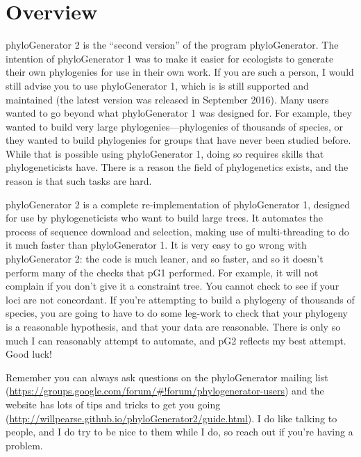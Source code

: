 \documentclass[12pt]{article}
\begin{document}
\section*{Overview}
phyloGenerator 2 is the ``second version'' of the program
phyloGenerator. The intention of phyloGenerator 1 was to make it
easier for ecologists to generate their own phylogenies for use in
their own work. If you are such a person, I would still advise you to
use phyloGenerator 1, which is is still supported and maintained (the
latest version was released in September 2016). Many users wanted to
go beyond what phyloGenerator 1 was designed for. For example, they
wanted to build very large phylogenies---phylogenies of thousands of
species, or they wanted to build phylogenies for groups that have
never been studied before. While that is possible using phyloGenerator
1, doing so requires skills that phylogeneticists have. There is a
reason the field of phylogenetics exists, and the reason is that such
tasks are hard.

phyloGenerator 2 is a complete re-implementation of phyloGenerator 1,
designed for use by phylogeneticists who want to build large trees. It
automates the process of sequence download and selection, making use
of multi-threading to do it much faster than phyloGenerator 1. It is
very easy to go wrong with phyloGenerator 2: the code is much leaner,
and so faster, and so it doesn't perform many of the checks that pG1
performed. For example, it will not complain if you don't give it a
constraint tree. You cannot check to see if your loci are not
concordant. If you're attempting to build a phylogeny of thousands of
species, you are going to have to do some leg-work to check that your
phylogeny is a reasonable hypothesis, and that your data are
reasonable. There is only so much I can reasonably attempt to
automate, and pG2 reflects my best attempt. Good luck!

Remember you can always ask questions on the phyloGenerator mailing
list
(\url{https://groups.google.com/forum/#!forum/phylogenerator-users})
and the website has lots of tips and tricks to get you going
(\url{http://willpearse.github.io/phyloGenerator2/guide.html}). I do
like talking to people, and I do try to be nice to them while I do, so
reach out if you're having a problem.
\end{document}
